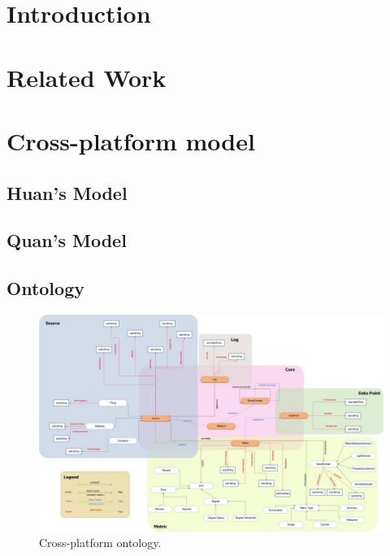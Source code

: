 \documentclass[runningheads,a4paper]{llncs}
\begin{document}
\section{Introduction}

\section{Related Work}

\section{Cross-platform model}

\subsection{Huan's Model}

\subsection{Quan's Model}

\subsection{Ontology}

\begin{figure}[h]
\centering
\includegraphics[scale=0.1]{ontology}
\caption{Cross-platform ontology.}
\end{figure}
\end{document}
